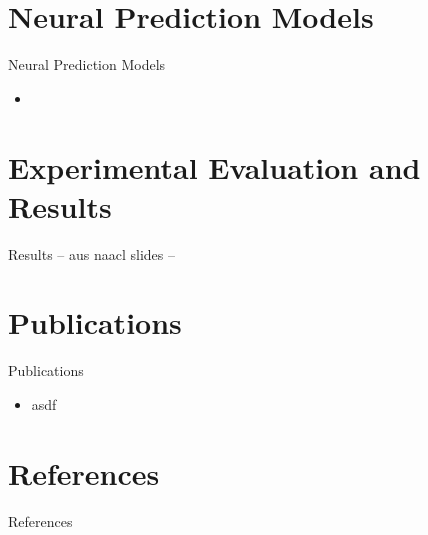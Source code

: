 \documentclass[aspectratio=169, 10pt]{beamer}
\begin{document}
    \section{Neural Prediction Models}
    \begin{frame}{Neural Prediction Models}
        \begin{itemize}
            \item
        \end{itemize}
    \end{frame}


    \section{Experimental Evaluation and Results}
    \begin{frame}{Results}
        -- aus naacl slides --
    \end{frame}


    \section{Publications}
    \begin{frame}{Publications}
        \begin{itemize}
            \item asdf
        \end{itemize}
    \end{frame}


    \section*{References}
    \begin{frame}{References}
        
        
    \end{frame}
\end{document}

